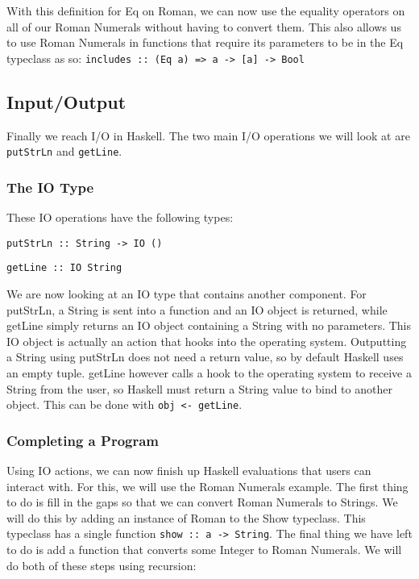 \documentclass{article}
\begin{document}
            \medskip\noindent
            With this definition for Eq on Roman, we can now use the equality operators on all of our Roman Numerals without having to convert them. This also allows us to use Roman Numerals in functions that require its parameters to be in the Eq typeclass as so: \lstinline{includes :: (Eq a) => a -> [a] -> Bool}
        
    \subsection{Input/Output}
        Finally we reach I/O in Haskell. The two main I/O operations we will look at are \lstinline{putStrLn} and \lstinline{getLine}.
        
        \subsubsection{The IO Type}
            These IO operations have the following types:
            
            \medskip
            \lstinline{putStrLn :: String -> IO ()}
            
            \smallskip
            \lstinline{getLine :: IO String}
            
            \medskip\noindent
            We are now looking at an IO type that contains another component. For putStrLn, a String is sent into a function and an IO object is returned, while getLine simply returns an IO object containing a String with no parameters. This IO object is actually an action that hooks into the operating system. Outputting a String using putStrLn does not need a return value, so by default Haskell uses an empty tuple. getLine however calls a hook to the operating system to receive a String from the user, so Haskell must return a String value to bind to another object. This can be done with \lstinline{obj <- getLine}.
    
        \subsubsection{Completing a Program}
            Using IO actions, we can now finish up Haskell evaluations that users can interact with. For this, we will use the Roman Numerals example. The first thing to do is fill in the gaps so that we can convert Roman Numerals to Strings. We will do this by adding an instance of Roman to the Show typeclass. This typeclass has a single function \lstinline{show :: a -> String}. The final thing we have left to do is add a function that converts some Integer to Roman Numerals. We will do both of these steps using recursion:
            
\end{document}
